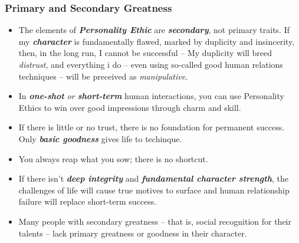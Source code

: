 \documentclass[11pt]{article}
\begin{document}
\subsubsection{Primary and Secondary Greatness}
\begin{itemize}
\item The elements of \emph{\textbf{Personality Ethic}} are \emph{\textbf{secondary}}, not primary traits. If my \emph{\textbf{character}} is fundamentally flawed, marked by duplicity and insincerity, then, in the long run, I cannot be successful -- My duplicity will breed \emph{distrust}, and everything i do -- even using so-called good human relations techniques -- will be preceived as \emph{manipulative}. 
\item In \emph{\textbf{one-shot} or \textbf{short-term}} human interactions, you can use Personality Ethics to win over good impressions through charm and skill.
\item If there is little or no trust, there is no foundation for permanent success. Only \emph{\textbf{basic goodness}} gives life to techinque.
\item You always reap what you sow; there is no shortcut.
\item If there isn't \emph{\textbf{deep integrity}} and \emph{\textbf{fundamental character strength}}, the challenges of life will cause true motives to surface and human relationship failure will replace short-term success.
\item Many people with secondary greatness -- that is, social recognition for their talents -- lack primary greatness or goodness in their character.
\end{itemize}
\end{document}
